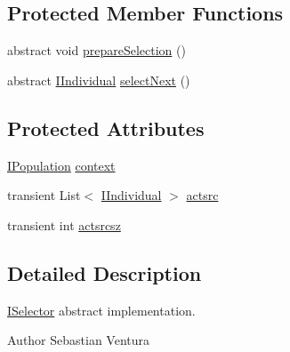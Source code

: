 \subsection*{Protected Member Functions}
\begin{DoxyCompactItemize}
\item 
abstract void \hyperlink{classnet_1_1sf_1_1jclec_1_1base_1_1_abstract_selector_a0c5d9cb96fef9786e272b9edd811111e}{prepare\-Selection} ()
\item 
abstract \hyperlink{interfacenet_1_1sf_1_1jclec_1_1_i_individual}{I\-Individual} \hyperlink{classnet_1_1sf_1_1jclec_1_1base_1_1_abstract_selector_aa2ccb539c608db9c14ebbc763807b95a}{select\-Next} ()
\end{DoxyCompactItemize}
\subsection*{Protected Attributes}
\begin{DoxyCompactItemize}
\item 
\hyperlink{interfacenet_1_1sf_1_1jclec_1_1_i_population}{I\-Population} \hyperlink{classnet_1_1sf_1_1jclec_1_1base_1_1_abstract_selector_a4304fe5c27aa7631dc91678d22473b94}{context}
\item 
transient List$<$ \hyperlink{interfacenet_1_1sf_1_1jclec_1_1_i_individual}{I\-Individual} $>$ \hyperlink{classnet_1_1sf_1_1jclec_1_1base_1_1_abstract_selector_abb353bff6e96b278329dff246d5648e4}{actsrc}
\item 
transient int \hyperlink{classnet_1_1sf_1_1jclec_1_1base_1_1_abstract_selector_ad405a34fb8182ec982b759fb0f6f8b2b}{actsrcsz}
\end{DoxyCompactItemize}


\subsection{Detailed Description}
\hyperlink{interfacenet_1_1sf_1_1jclec_1_1_i_selector}{I\-Selector} abstract implementation.

\begin{DoxyAuthor}{Author}
Sebastian Ventura 
\end{DoxyAuthor}


